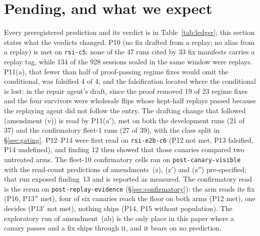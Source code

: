 \documentclass[11pt]{article}
\newcommand{\code}[1]{\texttt{#1}}
\begin{document}
\section{Pending, and what we expect}
\label{sec:pending}

Every preregistered prediction and its verdict is in Table~\ref{tab:ledger}; this section
states what the verdicts changed. P10 (no fix drafted from a replay; no alias from a replay) is
met on \code{rsi-c5}: none of the 47 runs cited by 33 fix manifests carries a replay tag, while
134 of the 928 sessions sealed in the same window were replays. P11(a), that fewer than half of
proof-passing regime fixes would omit the conditional, was falsified 4 of 4, and the
falsification located where the conditional is lost: in the repair agent's draft, since the
proof removed 19 of 23 regime fixes and the four survivors were wholesale flips whose kept-half
replays passed because the replaying agent did not follow the entry. The drafting change that
followed (amendment (v)) is read by P11(a$'$), met on both the development runs (21 of 37) and
the confirmatory fleet-1 runs (27 of 39), with the class split in \S\ref{sec:gating}. P12--P14
were first read on \code{rsi-e2b-c6} (P12 not met, P13 falsified, P14 undefined), and finding 12
then showed that those canaries compared two untreated arms. The fleet-10 confirmatory cells ran
on \code{post-canary-visible} with the read-count predictions of amendments~(z), (z$'$) and
(z$''$) pre-specified; that run exposed finding~13 and is reported as measured. The confirmatory
read is the rerun on \code{post-replay-evidence} (\S\ref{sec:confirmatory}): the arm reads its
fix (P16, P13$''$ met), four of six canaries reach the floor on both arms (P12 met), one decides
(P13$'$ not met), nothing ships (P14, P15 without population). The exploratory run of
amendment~(ab) is the only place in this paper where a canary passes and a fix ships through it,
and it bears on no prediction.
\end{document}
